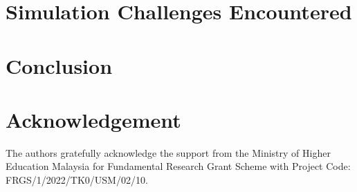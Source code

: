 \documentclass[9pt,a4paper,twocolumn,twoside]{tau-class/tau}
\begin{document}
\section{Simulation Challenges Encountered}

\section{Conclusion}

\section{Acknowledgement}
The authors gratefully acknowledge the support from
the Ministry of Higher Education Malaysia for Fundamental
Research Grant Scheme with Project Code:
FRGS/1/2022/TK0/USM/02/10.




\printbibliography

\end{document}
